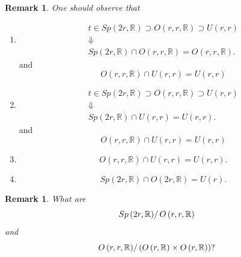\documentclass[aps,preprint]{revtex4}
\newtheorem{remark}[theorem]{Remark}
\begin{document}
\begin{remark}
One should observe that
\end{remark}

\begin{enumerate}
\item 
\begin{gather}
t\in Sp\left( 2r,\mathbb{R}\right) \supset O\left( r,r,\mathbb{R}\right)
\supset U\left( r,r\right) \\
\Downarrow \\
Sp\left( 2r,\mathbb{R}\right) \cap O\left( r,r,\mathbb{R}\right) =O\left(
r,r,\mathbb{R}\right) .
\end{gather}%
and 
\begin{equation}
O\left( r,r,\mathbb{R}\right) \cap U\left( r,r\right) =U\left( r,r\right)
\end{equation}

\item 
\begin{gather}
t\in Sp\left( 2r,\mathbb{R}\right) \supset O\left( r,r,\mathbb{R}\right)
\supset U\left( r,r\right) \\
\Downarrow \\
Sp\left( 2r,\mathbb{R}\right) \cap U\left( r,r\right) =U\left( r,r\right) .
\end{gather}%
and 
\begin{equation}
O\left( r,r,\mathbb{R}\right) \cap U\left( r,r\right) =U\left( r,r\right)
\end{equation}

\item 
\begin{equation}
O\left( r,r,\mathbb{R}\right) \cap U\left( r,r\right) =U\left( r,r\right) .
\end{equation}

\item 
\begin{equation}
Sp\left( 2r,\mathbb{R}\right) \cap O\left( 2r,\mathbb{R}\right) =U\left(
r\right) .
\end{equation}
\end{enumerate}

\begin{remark}
What are 
\begin{equation}
\left. Sp\left( 2r,\mathbb{R}\right) \right/ O\left( r,r,\mathbb{R}\right)
\end{equation}%
and%
\begin{equation}
\left. O\left( r,r,\mathbb{R}\right) \right/ \left( O\left( r,\mathbb{R}%
\right) \times O\left( r,\mathbb{R}\right) \right) ?
\end{equation}
\end{remark}
\end{document}

